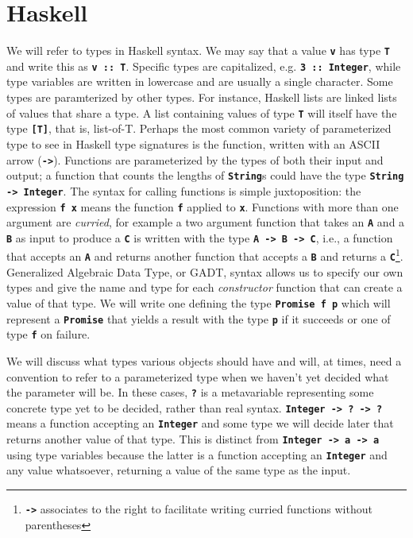 \documentclass[12pt, english, letterpaper]{kuthesis}
\newcommand{\lit}[1]{\textbf{\texttt{#1}}}
\begin{document}
\section*{Haskell}
We will refer to types in Haskell syntax.  We may say that a value \lit v has type \lit T and write this as \lit{v ::\ T}.  Specific types are capitalized, e.g. \lit{3 ::\ Integer}, while type variables are written in lowercase and are usually a single character.  Some types are paramterized by other types.  For instance, Haskell lists are linked lists of values that share a type.  A list containing values of type \lit T will itself have the type \lit{[T]}, that is, list-of-T.  Perhaps the most common variety of parameterized type to see in Haskell type signatures is the function, written with an ASCII arrow (\lit{->}).  Functions are parameterized by the types of both their input and output; a function that counts the lengths of \lit{String}s could have the type \lit{String -> Integer}.  The syntax for calling functions is simple juxtoposition: the expression \lit{f x} means the function \lit f applied to \lit x.  Functions with more than one argument are \emph{curried}, for example a two argument function that takes an \lit A and a \lit B as input to produce a \lit C is written with the type \lit{A -> B -> C}, i.e.,  a function that accepts an \lit A and returns another function that accepts a \lit B and returns a \lit C\footnote{\lit{->} associates to the right to facilitate writing curried functions without parentheses}.  Generalized Algebraic Data Type, or GADT, syntax allows us to specify our own types and give the name and type for each \emph{constructor} function that can create a value of that type.  We will write one defining the type \lit{Promise f p} which will represent a \lit{Promise} that yields a result with the type \lit p if it succeeds or one of type \lit f on failure.

We will discuss what types various objects should have and will, at times, need a convention to refer to a parameterized type when we haven't yet decided what the parameter will be.  In these cases, \lit ? is a metavariable representing some concrete type yet to be decided, rather than real syntax.  \lit{Integer -> ?\ -> ?} means a function accepting an \lit{Integer} and some type we will decide later that returns another value of that type.  This is distinct from \lit{Integer -> a -> a} using type variables because the latter is a function accepting an \lit{Integer} and any value whatsoever, returning a value of the same type as the input.
\end{document}
